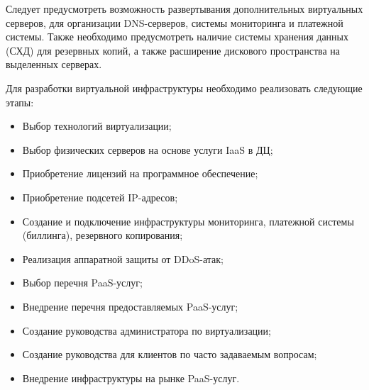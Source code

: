 Следует предусмотреть возможность развертывания дополнительных виртуальных серверов, для организации DNS-серверов, системы мониторинга и платежной системы.
Также необходимо предусмотреть наличие системы хранения данных (СХД) для резервных копий, а также расширение дискового пространства на выделенных серверах.

Для разработки виртуальной инфраструктуры необходимо реализовать следующие этапы:
\begin{itemize}
    \item Выбор технологий виртуализации;
    \item Выбор физических серверов на основе услуги IaaS в ДЦ;
    \item Приобретение лицензий на программное обеспечение;
    \item Приобретение подсетей IP-адресов;
    \item Создание и подключение инфраструктуры мониторинга, платежной системы (биллинга), резервного копирования;
    \item Реализация аппаратной защиты от DDoS-атак;
    \item Выбор перечня PaaS-услуг;
    \item Внедрение перечня предоставляемых PaaS-услуг;
    \item Создание руководства администратора по виртуализации;
    \item Создание руководства для клиентов по часто задаваемым вопросам;
    \item Внедрение инфраструктуры на рынке PaaS-услуг.
\end{itemize}

\clearpage
